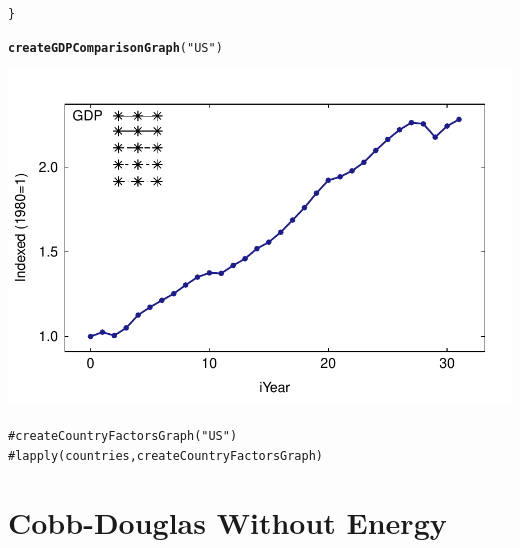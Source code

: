 \documentclass[preprint,authoryear,12pt]{elsarticle}\usepackage{graphicx, color}
\makeatletter
\def\maxwidth{ %
  \ifdim\Gin@nat@width>\linewidth
    \linewidth
  \else
    \Gin@nat@width
  \fi
}
\newcommand{\hlfunctioncall}[1]{\textcolor[rgb]{0.501960784313725,0,0.329411764705882}{\textbf{#1}}}%
\newcommand{\hlstring}[1]{\textcolor[rgb]{0.6,0.6,1}{#1}}%
\newcommand{\hlcomment}[1]{\textcolor[rgb]{0.180392156862745,0.6,0.341176470588235}{#1}}%
\newenvironment{kframe}{%
 \def\at@end@of@kframe{}%
 \ifinner\ifhmode%
  \def\at@end@of@kframe{\end{minipage}}%
  \begin{minipage}{\columnwidth}%
 \fi\fi%
 \def\FrameCommand##1{\hskip\@totalleftmargin \hskip-\fboxsep
 \colorbox{shadecolor}{##1}\hskip-\fboxsep
     \hskip-\linewidth \hskip-\@totalleftmargin \hskip\columnwidth}%
 \MakeFramed {\advance\hsize-\width
   \@totalleftmargin\z@ \linewidth\hsize
   \@setminipage}}%
 {\par\unskip\endMakeFramed%
 \at@end@of@kframe}
\newenvironment{knitrout}{}{} %
\makeatother
\begin{document}
\begin{knitrout}
\begin{kframe}
\begin{alltt}
                    
\}

\hlfunctioncall{createGDPComparisonGraph}(\hlstring{"US"})
\end{alltt}
\end{kframe}
\includegraphics[width=\maxwidth]{figure/graphs} 
\begin{kframe}\begin{alltt}

\hlcomment{#createCountryFactorsGraph("US")}
\hlcomment{#lapply(countries, createCountryFactorsGraph)}



\end{alltt}
\end{kframe}
\end{knitrout}


\section{Cobb-Douglas Without Energy}
\end{document}

